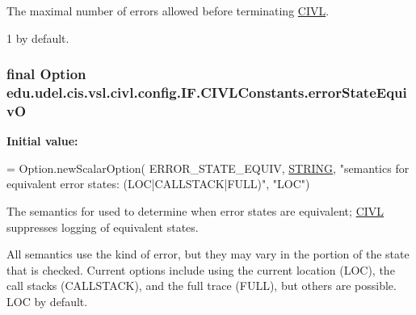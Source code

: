 The maximal number of errors allowed before terminating \hyperlink{classedu_1_1udel_1_1cis_1_1vsl_1_1civl_1_1CIVL}{C\+I\+V\+L}. 

1 by default. \hypertarget{classedu_1_1udel_1_1cis_1_1vsl_1_1civl_1_1config_1_1IF_1_1CIVLConstants_a2fe4ea5554b04c9631df30301f614ef9}{}
\subsubsection[{error\+State\+Equiv\+O}]{\setlength{\rightskip}{0pt plus 5cm}final Option edu.\+udel.\+cis.\+vsl.\+civl.\+config.\+I\+F.\+C\+I\+V\+L\+Constants.\+error\+State\+Equiv\+O\hspace{0.3cm}{\ttfamily [static]}}\label{classedu_1_1udel_1_1cis_1_1vsl_1_1civl_1_1config_1_1IF_1_1CIVLConstants_a2fe4ea5554b04c9631df30301f614ef9}
{\bfseries Initial value\+:}
\begin{DoxyCode}
= Option.newScalarOption(
            ERROR\_STATE\_EQUIV, \hyperlink{struct__STRING}{STRING},
            \textcolor{stringliteral}{"semantics for equivalent error states: (LOC|CALLSTACK|FULL)"},
            \textcolor{stringliteral}{"LOC"})
\end{DoxyCode}


The semantics for used to determine when error states are equivalent; \hyperlink{classedu_1_1udel_1_1cis_1_1vsl_1_1civl_1_1CIVL}{C\+I\+V\+L} suppresses logging of equivalent states. 

All semantics use the kind of error, but they may vary in the portion of the state that is checked. Current options include using the current location (L\+O\+C), the call stacks (C\+A\+L\+L\+S\+T\+A\+C\+K), and the full trace (F\+U\+L\+L), but others are possible. L\+O\+C by default. \hypertarget{classedu_1_1udel_1_1cis_1_1vsl_1_1civl_1_1config_1_1IF_1_1CIVLConstants_a16a8c2d0190f4db9abd16181c6afb62a}{}
